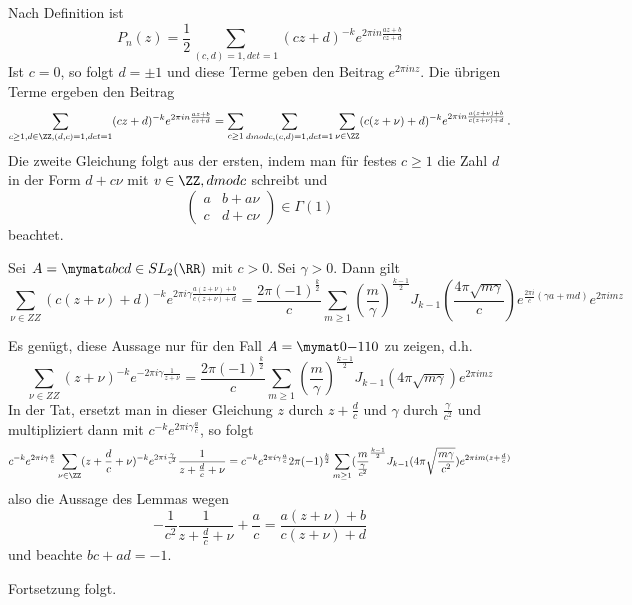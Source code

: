 \begin{bewe}
Nach Definition ist 
\[
	P_n(z) = \frac 12 \sum_{(c,d) = 1, det = 1} (cz+d)^{-k} e^{2\pi in \frac{az+b}{cz+d}}
\]
Ist $c = 0$, so folgt $d = \pm 1$ und diese Terme geben den Beitrag $e^{2 \pi inz}$. Die übrigen Terme ergeben den Beitrag 
\[
	\sum_{c\geq 1, d\in \ZZ, (d,c) = 1, det = 1} (cz+d)^{-k} e^{2 \pi i n \frac{az+b}{cz+d}} = \sum_{c \geq 1} \sum_{d mod c, (c,d) = 1, det = 1} \sum_{\nu \in \ZZ} (c(z + \nu) +d)^{-k} e^{2\pi in \frac{a(z+\nu)+b}{c(z+\nu)+d}}
	\,.
\]
Die zweite Gleichung folgt aus der ersten, indem man für festes $c \geq 1$ die Zahl $d$ in der Form $d + c\nu$ mit $v \in \ZZ, d mod c$ schreibt und 
\[
	\begin{pmatrix}
	a & b + a\nu\\
	c & d + c\nu
	\end{pmatrix}
	\in \Gamma(1)
\]
beachtet.

\begin{lemm}
Sei $A = \mymat abcd \in SL_2(\RR)$ mit $c > 0$. Sei $\gamma > 0$. Dann gilt
\[
	\sum_{\nu \in ZZ} (c(z + \nu) +d)^{-k} e^{2\pi i\gamma \frac{a(z+\nu)+b}{c(z+\nu)+d}} = \frac{2\pi (-1)^{\frac k2}}c \sum_{m \geq 1} (\frac m\gamma)^{\frac{k-1}2} J_{k-1}(\frac{4\pi\sqrt{m\gamma}}c) e^{\frac{2\pi i}c (\gamma a + md)} e^{2\pi imz}
\]
\end{lemm}

\begin{bewe}
Es genügt, diese Aussage nur für den Fall $A = \mymat 0{-1}10$ zu zeigen, d.h.
\[
	\sum_{\nu \in ZZ} (z + \nu)^{-k} e^{-2\pi i\gamma \frac{1}{z+\nu}} = \frac{2\pi (-1)^{\frac k2}}c \sum_{m \geq 1} (\frac m\gamma)^{\frac{k-1}2} J_{k-1}(4\pi\sqrt{m\gamma}) e^{2\pi imz}
\]
In der Tat, ersetzt man in dieser Gleichung $z$ durch $z + \frac dc$ und $\gamma$ durch $\frac{\gamma}{c^2}$ und multipliziert dann mit $c^{-k} e^{2\pi i \gamma \frac ac}$, so folgt
\[
	c^{-k} e^{2\pi i\gamma \frac ac} \sum_{\nu \in \ZZ} (z + \frac dc + \nu)^{-k} e^{2\pi i \frac{\gamma}{c^2}} \frac{1}{z + \frac dc + \nu} = c^{-k} e^{2\pi i \gamma \frac ac} 2\pi (-1)^{\frac k2} \sum_{m\geq 1} (\frac {m}{\frac{\gamma}{c^2}}^{\frac {k-1}2} J_{k-1}(4\pi \sqrt{\frac{m\gamma}{c^2}}) e^{2\pi i m(z+ \frac dc)}
\]
also die Aussage des Lemmas wegen
\[
- \frac{1}{c^2} \frac{1}{z+\frac dc +\nu} + \frac ac = \frac{a(z+\nu)+b}{c(z+\nu)+d}
\]
und beachte $bc+ad = -1$.
\end{bewe}

Fortsetzung folgt.

\end{bewe}






